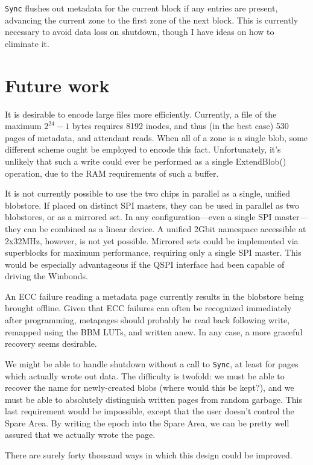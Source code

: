\documentclass[letterpaper,10pt]{article}
\begin{document}
\texttt{Sync} flushes out metadata for the current block if any entries are
present, advancing the current zone to the first zone of the next block. This
is currently necessary to avoid data loss on shutdown, though I have ideas on
how to eliminate it.

\section{Future work} \label{futurework}
It is desirable to encode large files more efficiently. Currently, a file of
the maximum $2^{24}-1$ bytes requires 8192 inodes, and thus (in the best case)
530 pages of metadata, and attendant reads. When all of a zone is a single
blob, some different scheme ought be employed to encode this fact.
Unfortunately, it's unlikely that such a write could ever be performed as a
single ExtendBlob() operation, due to the RAM requirements of such a buffer.

It is not currently possible to use the two chips in parallel as a single,
unified blobstore. If placed on distinct SPI masters, they can be used in
parallel as two blobstores, or as a mirrored set. In any configuration---even
a single SPI master---they can be combined as a linear device. A unified
2Gbit namespace accessible at 2x32MHz, however, is not yet possible. Mirrored
sets could be implemented via superblocks for
maximum performance, requiring only a single SPI master. This would be especially
advantageous if the QSPI interface had been capable of driving the Winbonds.

An ECC failure reading a metadata page currently results in the blobstore being
brought offline. Given that ECC failures can often be recognized immediately
after programming, metapages should probably be read back following write,
remapped using the BBM LUTs, and written anew. In any case, a more graceful
recovery seems desirable.

We might be able to handle shutdown without a call to \texttt{Sync}, at least
for pages which actually wrote out data. The difficulty is twofold: we must
be able to recover the name for newly-created blobs (where would this be kept?),
and we must be able to absolutely distinguish written pages from random garbage.
This last requirement would be impossible, except that the user doesn't control
the Spare Area. By writing the epoch into the Spare Area, we can be pretty
well assured that we actually wrote the page.

There are surely forty thousand ways in which this design could be improved.
\end{document}

